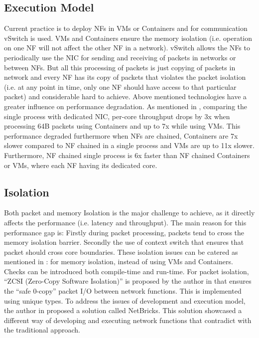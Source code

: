 \documentclass[10pt, a4paper, conference]{IEEEtran}
\begin{document}
\subsection{Execution Model}
Current practice is to deploy NFs in VMs or Containers and for communication vSwitch is used. VMs and Containers ensure the memory isolation (i.e. operation on one NF will not affect the other NF in a network). vSwitch allows the NFs to periodically use the NIC for sending and receiving of packets in networks or between NFs. But all this processing of packets is just copying of packets in network and every NF has its copy of packets that violates the packet isolation (i.e. at any point in time, only one NF should have access to that particular packet) and considerable hard to achieve. Above mentioned technologies have a greater influence on performance degradation. As mentioned in \cite{Panda2016}, comparing the single process with dedicated NIC, per-core throughput drops by 3x when processing 64B packets using Containers and up to 7x while using VMs. This performance degraded furthermore when NFs are chained, Containers are 7x slower compared to NF chained in a single process and VMs are up to 11x slower. Furthermore, NF chained single process is 6x faster than NF chained Containers or VMs, where each NF having its dedicated core. 
\subsection{Isolation}
Both packet and memory Isolation is the major challenge to achieve, as it directly affects the performance (i.e. latency and throughput). The main reason for this performance gap is: Firstly during packet processing, packets tend to cross the memory isolation barrier. Secondly the use of context switch that ensures that packet should cross core boundaries. These isolation issues can be catered as mentioned in \cite{Panda2016}: for memory isolation, instead of using VMs and Containers. Checks can be introduced both compile-time and run-time. For packet isolation, “ZCSI (Zero-Copy Software Isolation)” is proposed by the author in \cite{Panda2016} that ensures the “safe 0-copy” packet I/O between network functions. This is implemented using unique types\cite{Gordon}.
To address the issues of development and execution model, the author in \cite{Panda2016} proposed a solution called NetBricks. This solution showcased a different way of developing and executing network functions that contradict with the traditional approach. 
\end{document}
